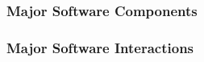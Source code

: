\documentclass{article}
\begin{document}


\subsubsection{Major Software Components}
\label{msc}


\subsubsection{Major Software Interactions}
\label{msi}

\end{document}
